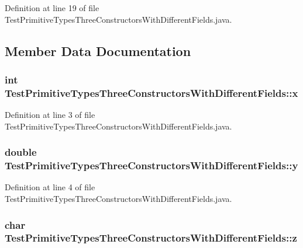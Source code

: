 Definition at line 19 of file TestPrimitiveTypesThreeConstructorsWithDifferentFields.java.



\subsection{Member Data Documentation}
\hypertarget{classTestPrimitiveTypesThreeConstructorsWithDifferentFields_a252f09fdacfa1783ea30801827076fb1}{
\subsubsection[{x}]{\setlength{\rightskip}{0pt plus 5cm}int {\bf TestPrimitiveTypesThreeConstructorsWithDifferentFields::x}}}
\label{classTestPrimitiveTypesThreeConstructorsWithDifferentFields_a252f09fdacfa1783ea30801827076fb1}


Definition at line 3 of file TestPrimitiveTypesThreeConstructorsWithDifferentFields.java.

\hypertarget{classTestPrimitiveTypesThreeConstructorsWithDifferentFields_aca6793749b2098bcd3cadd31e71f1080}{
\subsubsection[{y}]{\setlength{\rightskip}{0pt plus 5cm}double {\bf TestPrimitiveTypesThreeConstructorsWithDifferentFields::y}}}
\label{classTestPrimitiveTypesThreeConstructorsWithDifferentFields_aca6793749b2098bcd3cadd31e71f1080}


Definition at line 4 of file TestPrimitiveTypesThreeConstructorsWithDifferentFields.java.

\hypertarget{classTestPrimitiveTypesThreeConstructorsWithDifferentFields_a112ee7f3b539bf2252e2847b57fa7267}{
\subsubsection[{z}]{\setlength{\rightskip}{0pt plus 5cm}char {\bf TestPrimitiveTypesThreeConstructorsWithDifferentFields::z}}}
\label{classTestPrimitiveTypesThreeConstructorsWithDifferentFields_a112ee7f3b539bf2252e2847b57fa7267}


